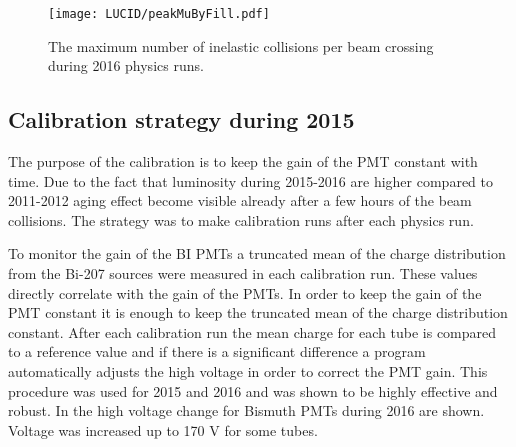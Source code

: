 \begin{figure}
\centering
\texttt{[image: LUCID/peakMuByFill.pdf]}
\caption{The maximum number of inelastic collisions per beam crossing during 2016 physics runs.}
\label{fig:peakMuByFill}
\end{figure}

\subsection{Calibration strategy during 2015}
\label{subsec:calibPerformance}


The purpose of the calibration is to keep the gain of the PMT constant with time.
Due to the fact that luminosity during 2015-2016 are higher compared to 2011-2012
aging effect become visible already after a few hours of the beam collisions.
The strategy was to make calibration runs after each physics run.

To monitor the gain of the BI PMTs a truncated mean of the charge distribution from the Bi-207 sources were measured in each calibration run.
These values directly correlate with the gain of the PMTs. 
In order to keep the gain of the PMT constant it is enough to keep the truncated mean of the charge distribution constant.
After each calibration run the mean charge for each tube is compared to a reference value and if there is a significant difference a program 
automatically adjusts the high voltage in order to correct the PMT gain.
This procedure was used for 2015 and 2016 and was shown to be highly effective and robust.
In  the high voltage change for Bismuth PMTs during 2016 are shown. 
Voltage was increased up to 170 V for some tubes.


